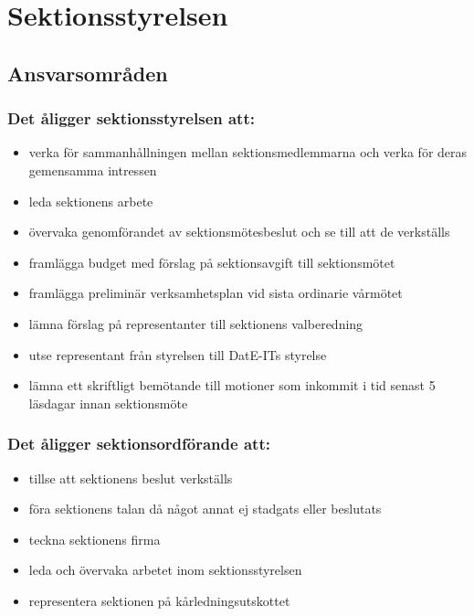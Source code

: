 \section{Sektionsstyrelsen}

\subsection{Ansvarsområden}

\subsubsection{Det åligger sektionsstyrelsen att:}

\begin{itemize}
  \item verka för sammanhållningen mellan sektionsmedlemmarna och verka för deras gemensamma intressen 
  \item leda sektionens arbete 
  \item övervaka genomförandet av sektionsmötesbeslut och se till att de verkställs 
  \item framlägga budget med förslag på sektionsavgift till sektionsmötet 
  \item framlägga preliminär verksamhetsplan vid sista ordinarie vårmötet 
  \item lämna förslag på representanter till sektionens valberedning 
  \item utse representant från styrelsen till DatE-ITs styrelse
  \item lämna ett skriftligt bemötande till motioner som inkommit i tid senast
		5 läsdagar innan sektionsmöte
\end{itemize}

\subsubsection{Det åligger sektionsordförande att:} 

\begin{itemize}
  \item tillse att sektionens beslut verkställs 
  \item föra sektionens talan då något annat ej stadgats eller beslutats 
  \item teckna sektionens firma 
  \item leda och övervaka arbetet inom sektionsstyrelsen 
  \item representera sektionen på kårledningsutskottet
\end{itemize}

